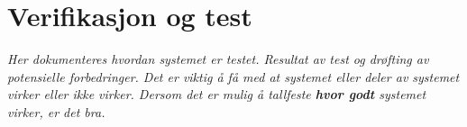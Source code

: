 \section{Verifikasjon og test}
\label{sec:verifikasjon}
\textit{Her dokumenteres hvordan systemet er testet. Resultat av test og drøfting av potensielle forbedringer. Det er viktig å få med at systemet eller deler av systemet virker eller ikke virker. Dersom det er mulig å tallfeste \textbf{hvor godt} systemet virker, er det bra.}